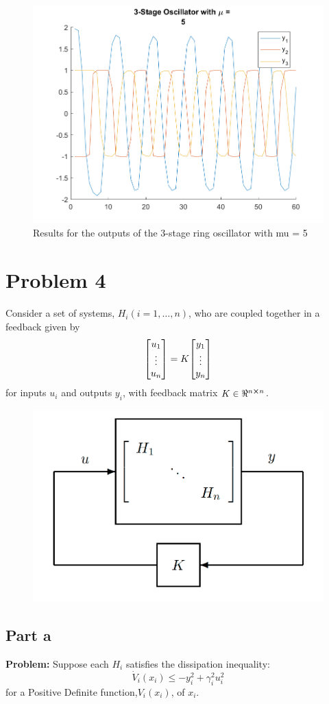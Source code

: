 \documentclass[letter]{article}
\begin{document}
\begin{figure}[p]
	\centering
	\includegraphics[width=0.7\linewidth]{fig/HW6_pblm3_results_mu_5}
	\caption{Results for the outputs of the 3-stage ring oscillator with mu = 5}
	\label{fig:pblm3_mu5}
\end{figure}




\newpage
\newpage
\section{Problem 4}
Consider a set of systems, $H_i (i=1,\dots,n)$, who are coupled together in a feedback given by
$$\mqty[u_1\\ \vdots \\ u_n] = K \mqty[y_1\\ \vdots \\ y_n]$$
for inputs $u_i$ and outputs $y_i$, with feedback matrix $K \in \real^{n\cross n}$.

\begin{figure}[h]
	\centering
	\includegraphics[width=0.5\linewidth]{fig/pblm4_given_fig}
	\label{fig:pblm4givenfig}
\end{figure}

\subsection{Part a}
\textbf{Problem:}
Suppose each $H_i$ satisfies the dissipation inequality:
$$\dot{V}_i(x_i) \leq -y_i^2 + \gamma_i^2 u_i^2$$
for a Positive Definite function,$V_i(x_i)$, of $x_i$.\\
\end{document}
